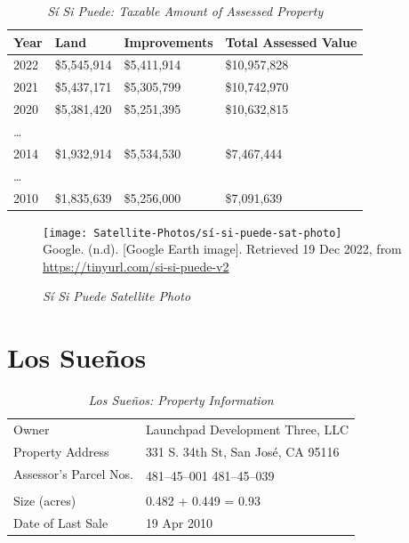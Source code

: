 \begin{table}[htb]
  \SingleSpacing%
  \caption[Sí Si Puede: Taxable Amount of Assessed Propery]{\textit{Sí Si Puede: Taxable Amount of Assessed Property}}\label{tab:sí-si-puede-taxable-amount}
  \begin{tabular}{llll}
    \toprule
    Year & Land        & Improvements & Total Assessed Value \\
    \midrule
    2022 & \$5,545,914 & \$5,411,914  & \$10,957,828 \\
    2021 & \$5,437,171 & \$5,305,799  & \$10,742,970 \\
    2020 & \$5,381,420 & \$5,251,395  & \$10,632,815 \\
    \ldots \\
    2014 & \$1,932,914 & \$5,534,530  & \$7,467,444 \\
    \ldots \\
    2010 & \$1,835,639 & \$5,256,000  & \$7,091,639 \\
    \bottomrule
  \end{tabular}
\end{table}

\begin{figure}[hbt]
  \centering
  \caption[Sí Si Puede Satellite Photo]{\textit{Sí Si Puede Satellite Photo}}\label{fig:sí-si-puede-sat-photo}
  \texttt{[image: Satellite-Photos/sí-si-puede-sat-photo]}\\ %
  \footnotesize
  Google. (n.d). [Google Earth image]. Retrieved 19 Dec 2022, from \url{https://tinyurl.com/si-si-puede-v2} %
\end{figure}


\clearpage
\section{Los Sueños}\label{sec:los-suenos-info}
\begin{table}[htb]
  \SingleSpacing%
  \caption[Los Sueños: Property Information]{\textit{Los Sueños: Property Information}}\label{tab:los-sueños-prop-info}
  \begin{tabular}{ll}
    \toprule
    Owner                  & Launchpad Development Three, LLC \\
    Property Address       & 331 S. 34th St, San José, CA 95116 \\
    Assessor's Parcel Nos. & \multirow[t]{2}{1in}{481–45–001 481–45–039} \\
    \\
    Size (acres)           & 0.482 + 0.449 = 0.93 \\
    Date of Last Sale      & 19 Apr 2010 \\
    \bottomrule
  \end{tabular}
\end{table}

